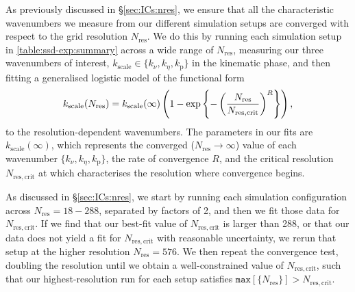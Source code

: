 As previously discussed in \S\ref{sec:ICs:nres}, we ensure that all the characteristic wavenumbers we measure from our different simulation setups are converged with respect to the grid resolution $N_\mathrm{res}$. We do this by running each simulation setup in \autoref{table:ssd-exp:summary} across a wide range of $N_\mathrm{res}$, measuring our three wavenumbers of interest, $k_\mathrm{scale} \in \{k_\nu, k_\eta, k_\mathrm{p}\}$ in the kinematic phase, and then fitting a generalised logistic model of the functional form
\begin{align}
    k_\mathrm{scale}(N_\mathrm{res})
        = k_\mathrm{scale}(\infty) \left( 
                1 - \exp\left\{  -\left( \frac{N_\mathrm{res}}{N_\mathrm{res, crit}} \right)^R  \right\}
             \right)
        , \label{eqn:nres}
\end{align}
to the resolution-dependent wavenumbers. The parameters in our fits are $k_\mathrm{scale}(\infty)$, which represents the converged ($N_\mathrm{res} \to \infty$) value of each wavenumber $\{k_\nu, k_\eta, k_\mathrm{p}\}$, the rate of convergence $R$, and the critical resolution $N_\mathrm{res, crit}$ at which characterises the resolution where convergence begins.

As discussed in \S\ref{sec:ICs:nres}, we start by running each simulation configuration across $N_\mathrm{res} = 18 - 288$, separated by factors of 2, and then we fit those data for $N_\mathrm{res,crit}$. If we find that our best-fit value of $N_\mathrm{res,crit}$ is larger than 288, or that our data does not yield a fit for $N_\mathrm{res,crit}$ with reasonable uncertainty, we rerun that setup at the higher resolution $N_\mathrm{res} = 576$. We then repeat the convergence test, doubling the resolution until we obtain a well-constrained value of $N_\mathrm{res,crit}$, such that our highest-resolution run for each setup satisfies $\texttt{max}[\{N_\mathrm{res}\}] > N_\mathrm{res, crit}$.

